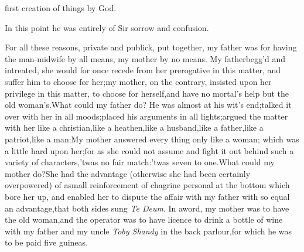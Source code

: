 \documentclass[twoside]{article}
\begin{document}
\break
{}
first creation of things by God.

In this point he was entirely of Sir\break
{} 
sorrow and confusion.


For all these reasons, private and pub\-lick, put together,\tsk
my father was for having the man-midwife by all means,\tsk
my mother by no means. My father\break begg’d and intreated, she
would for once recede from her prerogative in this matter, and
suffer him to choose for her;\tsk my mother, on the
contrary, insisted up\-on her privilege in this matter, to
choose for herself,\tsk and have no mortal’s help but the old
woman’s.\tsk What could my father do? He was almost at his
wit’s end;\tsh talked it over with her in all
moods;\tsk placed his arguments in all lights;\tsk argued the
matter with her like a christian,\tsk like a heathen,\tsk like
a husband,\tsk like a father,\tsk like a patriot,\tsk like a
man:\tsk My mother answered every thing only like a woman;
which was a little hard upon her;\tsk for as she could not
assume and fight it out behind such a variety of
characters,\tsk\break ’twas no fair match:\tsk ’twas seven to
one.\tsk What could my mother do?\tsk\break She had the
advantage (otherwise she had been certainly overpowered) of
a\break small reinforcement of chagrine personal at the bottom
which bore her up, and enabled her to dispute the affair with my
father with so equal an advantage,\tsh\break that both sides
sung \textit{Te Deum}. In a\break word, my mother was to have
the old woman,\tsk and the operator was to have licence to
drink a bottle of wine with
my father and my uncle
\textit{Toby Shandy} in the back parlour,\tsk for which he was
to be paid five guineas.
\end{document}
